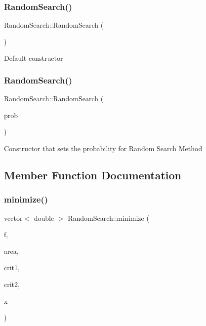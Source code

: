 \subsubsection{\texorpdfstring{Random\+Search()}{RandomSearch()}\hspace{0.1cm}{\footnotesize\ttfamily [1/2]}}
{\footnotesize\ttfamily Random\+Search\+::\+Random\+Search (\begin{DoxyParamCaption}{ }\end{DoxyParamCaption})\hspace{0.3cm}{\ttfamily [default]}}

Default constructor \mbox{\label{class_random_search_a3158fb489b681187d450c5297b90ce84}} 
\subsubsection{\texorpdfstring{Random\+Search()}{RandomSearch()}\hspace{0.1cm}{\footnotesize\ttfamily [2/2]}}
{\footnotesize\ttfamily Random\+Search\+::\+Random\+Search (\begin{DoxyParamCaption}\item[{double}]{prob }\end{DoxyParamCaption})}

Constructor that sets the probability for Random Search Method 

\subsection{Member Function Documentation}
\mbox{\label{class_random_search_a411b0ec16c09bfa51879f88bbb98692e}} 
\subsubsection{\texorpdfstring{minimize()}{minimize()}}
{\footnotesize\ttfamily vector$<$ double $>$ Random\+Search\+::minimize (\begin{DoxyParamCaption}\item[{\hyperlink{class_function}{Function} \&}]{f,  }\item[{\hyperlink{class_area}{Area} \&}]{area,  }\item[{\hyperlink{class_stop_criterion}{Stop\+Criterion} \&}]{crit1,  }\item[{\hyperlink{class_stop_criterion}{Stop\+Criterion} \&}]{crit2,  }\item[{vector$<$ double $>$}]{x }\end{DoxyParamCaption})\hspace{0.3cm}{\ttfamily [virtual]}}

